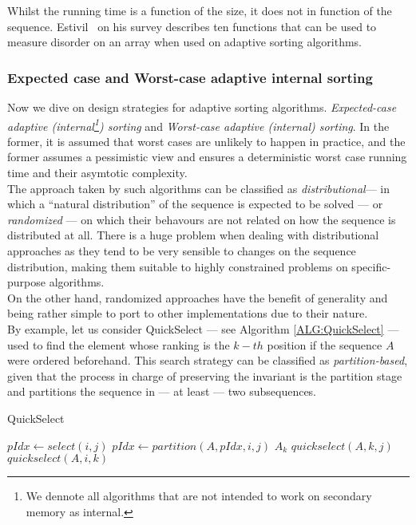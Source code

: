 Whilst the running time is a function of the size, it does not in function of the sequence. Estivil~\cite{estivil92} on his survey describes ten functions that can be used to measure disorder on an array when used on adaptive sorting algorithms.\\

\subsubsection{Expected case and Worst-case adaptive internal sorting}

Now we dive on design strategies for adaptive sorting algorithms. \textit{Expected-case adaptive (internal\footnote{We dennote all algorithms that are not intended to work on secondary memory as internal.}) sorting} and \textit{Worst-case adaptive (internal) sorting}. In the former, it is assumed that worst cases are unlikely to happen in practice, and the former assumes a pessimistic view and ensures a deterministic worst case running time and their asymtotic complexity.\\

The approach taken by such algorithms can be classified as \textit{distributional}--- in which a ``natural distribution'' of the sequence is expected to be solved --- or \textit{randomized} --- on which their behavours are not related on how the sequence is distributed at all. There is a huge problem when dealing with distributional approaches as they tend to be very sensible to changes on the sequence distribution, making them suitable to highly constrained problems on specific-purpose algorithms.\\

On the other hand, randomized approaches have the benefit of generality and being rather simple to port to other implementations due to their nature.\\

By example, let us consider QuickSelect --- see Algorithm \ref{ALG:QuickSelect} --- used to find the element whose ranking is the $k-th$ position if the sequence $A$ were ordered beforehand. This search strategy can be classified as \textit{partition-based}, given that the process in charge of preserving the invariant is the partition stage and partitions the sequence in --- at least --- two subsequences.\\


\begin{algorithm}
  \caption{QuickSelect}\label{ALG:QuickSelect}
  \begin{algorithmic}[1]
    \State $pIdx \gets select(i,j)$
    \State $pIdx \gets partition(A,pIdx,i,j)$
     \Return $A_k$
    \EndIf
     \Return $quickselect(A, k, j)$
    \EndIf
     \Return $quickselect(A, i, k)$
    \EndIf
    \EndProcedure
  \end{algorithmic}
\end{algorithm}

